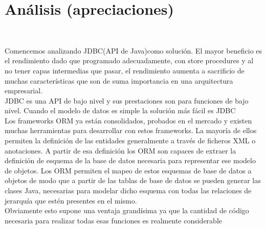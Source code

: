 \section{Análisis (apreciaciones)} 
\textbf{}\\
\begin{flushleft}


\begin{itemize}
Comencemos analizando JDBC(API de Java)como solución. El mayor beneficio es el rendimiento dado
que programado adecuadamente, con store procedures y al no tener capas intermedias
que pasar, el rendimiento aumenta a sacrificio de muchas características que son de suma
importancia en una arquitectura empresarial. \textbf{}\\
JDBC es una API de bajo nivel y sus prestaciones son para funciones de bajo nivel.
Cuando el modelo de datos es simple la solución más fácil es JDBC \textbf{}\\
Los frameworks ORM ya están consolidados, probados en el mercado y existen muchas
herramientas para desarrollar con estos frameworks. La mayoría de ellos permiten la
definición de las entidades generalmente a través de ficheros XML o anotaciones. A partir
de esa definición los ORM son capaces de extraer la definición de esquema de la base de
datos necesaria para representar ese modelo de objetos. Los ORM permiten el mapeo de
estos esquemas de base de datos a objetos de modo que a partir de las tablas de base de
datos se pueden generar las clases Java, necesarias para modelar dicho esquema con
todas las relaciones de jerarquía que estén presentes en el mismo.\textbf{}\\
Obviamente esto supone una ventaja grandísima ya que la cantidad de código necesaria
para realizar todas esas funciones es realmente considerable\textbf{}\\
\end{itemize} 


\end{flushleft}
